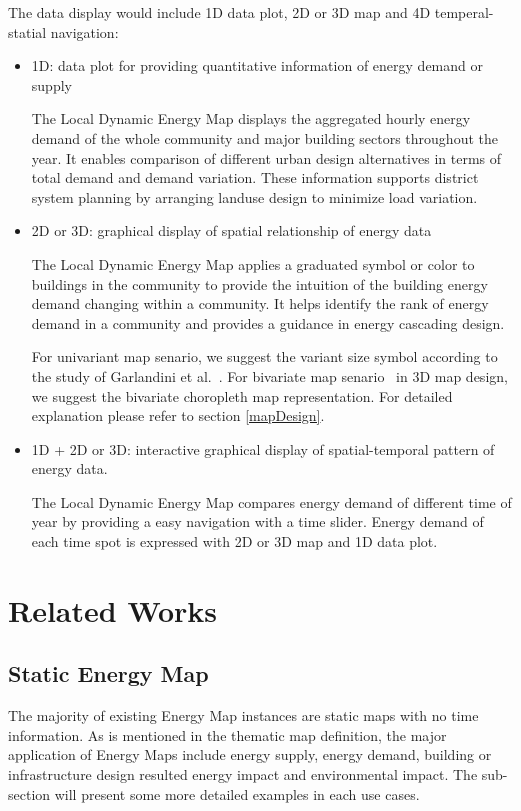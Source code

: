 \documentclass[hidelinks,12pt]{article}
\begin{document}
The data display would include 1D data plot, 2D or 3D map and 4D
temperal-statial navigation:
\begin{itemize}
\item 1D: data plot for providing quantitative information of energy
  demand or supply

  The Local Dynamic Energy Map displays the aggregated hourly energy
  demand of the whole community and major building sectors throughout
  the year. It enables comparison of different urban design
  alternatives in terms of total demand and demand variation. These
  information supports district system planning by arranging landuse
  design to minimize load variation.

\item 2D or 3D: graphical display of spatial relationship of energy data

  The Local Dynamic Energy Map applies a graduated symbol or color to
  buildings in the community to provide the intuition of the building
  energy demand changing within a community. It helps identify the
  rank of energy demand in a community and provides a guidance in
  energy cascading design.
    
  For univariant map senario, we suggest the variant size symbol
  according to the study of Garlandini et al.~\cite{Garlandini2009,
    doi:10.1559/1523040639298}. For bivariate map
  senario~\cite{bimapWiki} in 3D map design, we suggest the bivariate
  choropleth map representation. For detailed explanation please refer
  to section \ref{mapDesign}.


\item 1D + 2D or 3D: interactive graphical display of spatial-temporal
  pattern of energy data.
  
  The Local Dynamic Energy Map compares energy demand of different
  time of year by providing a easy navigation with a time
  slider. Energy demand of each time spot is expressed with 2D or 3D
  map and 1D data plot.
\end{itemize}

\section{Related Works}
\subsection{Static Energy Map}
The majority of existing Energy Map instances are static maps with no
time information. As is mentioned in the thematic map definition, the
major application of Energy Maps include energy supply, energy demand,
building or infrastructure design resulted energy impact and
environmental impact. The sub-section will present some more detailed
examples in each use cases.
\end{document}

